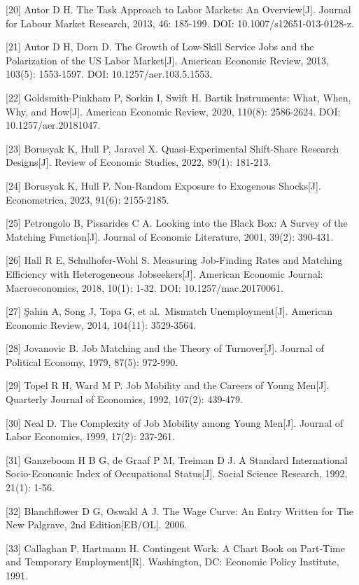 {[}20{]} Autor D H. The Task Approach to Labor Markets: An Overview{[}J{]}. Journal for Labour Market Research, 2013, 46: 185-199. DOI: 10.1007/s12651-013-0128-z.

{[}21{]} Autor D H, Dorn D. The Growth of Low-Skill Service Jobs and the Polarization of the US Labor Market{[}J{]}. American Economic Review, 2013, 103(5): 1553-1597. DOI: 10.1257/aer.103.5.1553.

{[}22{]} Goldsmith-Pinkham P, Sorkin I, Swift H. Bartik Instruments: What, When, Why, and How{[}J{]}. American Economic Review, 2020, 110(8): 2586-2624. DOI: 10.1257/aer.20181047.

{[}23{]} Borusyak K, Hull P, Jaravel X. Quasi-Experimental Shift-Share Research Designs{[}J{]}. Review of Economic Studies, 2022, 89(1): 181-213.

{[}24{]} Borusyak K, Hull P. Non-Random Exposure to Exogenous Shocks{[}J{]}. Econometrica, 2023, 91(6): 2155-2185.

{[}25{]} Petrongolo B, Pissarides C A. Looking into the Black Box: A Survey of the Matching Function{[}J{]}. Journal of Economic Literature, 2001, 39(2): 390-431.

{[}26{]} Hall R E, Schulhofer-Wohl S. Measuring Job-Finding Rates and Matching Efficiency with Heterogeneous Jobseekers{[}J{]}. American Economic Journal: Macroeconomics, 2018, 10(1): 1-32. DOI: 10.1257/mac.20170061.

{[}27{]} Şahin A, Song J, Topa G, et al.~Mismatch Unemployment{[}J{]}. American Economic Review, 2014, 104(11): 3529-3564.

{[}28{]} Jovanovic B. Job Matching and the Theory of Turnover{[}J{]}. Journal of Political Economy, 1979, 87(5): 972-990.

{[}29{]} Topel R H, Ward M P. Job Mobility and the Careers of Young Men{[}J{]}. Quarterly Journal of Economics, 1992, 107(2): 439-479.

{[}30{]} Neal D. The Complexity of Job Mobility among Young Men{[}J{]}. Journal of Labor Economics, 1999, 17(2): 237-261.

{[}31{]} Ganzeboom H B G, de Graaf P M, Treiman D J. A Standard International Socio-Economic Index of Occupational Status{[}J{]}. Social Science Research, 1992, 21(1): 1-56.

{[}32{]} Blanchflower D G, Oswald A J. The Wage Curve: An Entry Written for The New Palgrave, 2nd Edition{[}EB/OL{]}. 2006.

{[}33{]} Callaghan P, Hartmann H. Contingent Work: A Chart Book on Part-Time and Temporary Employment{[}R{]}. Washington, DC: Economic Policy Institute, 1991.

